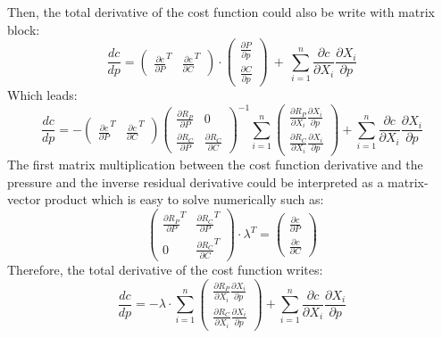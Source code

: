 \documentclass[11pt]{article}
\begin{document}
Then, the total derivative of the cost function could also be write with matrix block:
\begin{equation}
\frac{dc}{dp}
=
\begin{pmatrix}
\frac{\partial c}{\partial P}^T & \frac{\partial c}{\partial C}^T
\end{pmatrix} \cdot
\begin{pmatrix}
\frac{\partial P}{\partial p} \\ \frac{\partial C}{\partial p}
\end{pmatrix} \ + \ 
\sum_{i=1}^n \frac{\partial c}{\partial X_i}\frac{\partial X_i}{\partial p}
\end{equation}
Which leads:
\begin{equation}
\frac{dc}{dp}
= -
\begin{pmatrix}
\frac{\partial c}{\partial P}^T & \frac{\partial c}{\partial C}^T
\end{pmatrix}
\begin{pmatrix}
\frac{\partial R_P}{\partial P} & 0 \\ 
\frac{\partial R_C}{\partial P} & \frac{\partial R_C}{\partial C}
\end{pmatrix}^{-1} \sum_{i=1}^n 
\begin{pmatrix}
\frac{\partial R_P}{\partial X_i}\frac{\partial X_i}{\partial p} \\ \frac{\partial R_C}{\partial X_i}\frac{\partial X_i}{\partial p}
\end{pmatrix}+
\sum_{i=1}^n \frac{\partial c}{\partial X_i}\frac{\partial X_i}{\partial p}
\end{equation}
The first matrix multiplication between the cost function derivative and the pressure and the inverse residual derivative could be interpreted as a matrix-vector product which is easy to solve numerically such as:
\begin{equation}
\begin{pmatrix}
\frac{\partial R_P}{\partial P}^T & \frac{\partial R_C}{\partial P}^T \\ 
0 & \frac{\partial R_C}{\partial C}^T
\end{pmatrix} \cdot \lambda^T
= 
\begin{pmatrix}
\frac{\partial c}{\partial P} \\ \frac{\partial c}{\partial C}
\end{pmatrix}
\end{equation}
Therefore, the total derivative of the cost function writes:
\begin{equation}
\frac{dc}{dp}
= -
\lambda \cdot \sum_{i=1}^n 
\begin{pmatrix}
\frac{\partial R_P}{\partial X_i}\frac{\partial X_i}{\partial p} \\ \frac{\partial R_C}{\partial X_i}\frac{\partial X_i}{\partial p}
\end{pmatrix}+
\sum_{i=1}^n \frac{\partial c}{\partial X_i}\frac{\partial X_i}{\partial p}
\end{equation}
\end{document}
